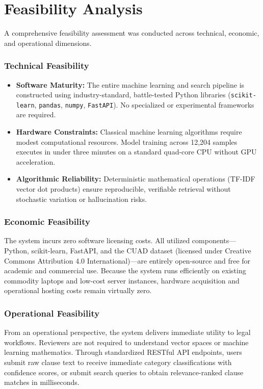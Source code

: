 \section{Feasibility Analysis}
\label{sec:feasibility_analysis}
A comprehensive feasibility assessment was conducted across technical, economic, and operational dimensions.

\subsubsection*{Technical Feasibility}
\begin{itemize}
    \item \textbf{Software Maturity:} The entire machine learning and search pipeline is constructed using industry-standard, battle-tested Python libraries (\texttt{scikit-learn}, \texttt{pandas}, \texttt{numpy}, \texttt{FastAPI}). No specialized or experimental frameworks are required.
    \item \textbf{Hardware Constraints:} Classical machine learning algorithms require modest computational resources. Model training across 12,204 samples executes in under three minutes on a standard quad-core CPU without GPU acceleration.
    \item \textbf{Algorithmic Reliability:} Deterministic mathematical operations (TF-IDF vector dot products) ensure reproducible, verifiable retrieval without stochastic variation or hallucination risks.
\end{itemize}

\subsubsection*{Economic Feasibility}
The system incurs zero software licensing costs. All utilized components—Python, scikit-learn, FastAPI, and the CUAD dataset (licensed under Creative Commons Attribution 4.0 International)—are entirely open-source and free for academic and commercial use. Because the system runs efficiently on existing commodity laptops and low-cost server instances, hardware acquisition and operational hosting costs remain virtually zero.

\subsubsection*{Operational Feasibility}
From an operational perspective, the system delivers immediate utility to legal workflows. Reviewers are not required to understand vector spaces or machine learning mathematics. Through standardized RESTful API endpoints, users submit raw clause text to receive immediate category classifications with confidence scores, or submit search queries to obtain relevance-ranked clause matches in milliseconds.

